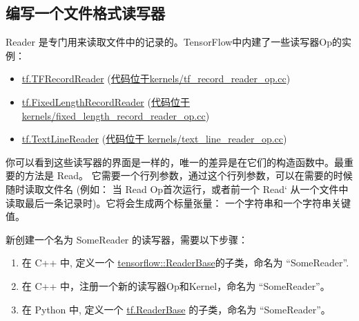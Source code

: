 \subsection{编写一个文件格式读写器
}\label{ux7f16ux5199ux4e00ux4e2aux6587ux4ef6ux683cux5f0fux8bfbux5199ux5668}

Reader
是专门用来读取文件中的记录的。TensorFlow中内建了一些读写器Op的实例：

\begin{itemize}
\tightlist
\item
  \href{tensorflow-zh/SOURCE/api_docs/python/io_ops.md\#TFRecordReader}{tf.TFRecordReader}
  (\href{https://tensorflow.googlesource.com/tensorflow/+/master/tensorflow/core/kernels/tf_record_reader_op.cc}{代码位于kernels/tf\_record\_reader\_op.cc})
\item
  \href{tensorflow-zh/SOURCE/api_docs/python/io_ops.md\#FixedLengthRecordReader}{tf.FixedLengthRecordReader}
  (\href{https://tensorflow.googlesource.com/tensorflow/+/master/tensorflow/core/kernels/fixed_length_record_reader_op.cc}{代码位于
  kernels/fixed\_length\_record\_reader\_op.cc})
\item
  \href{tensorflow-zh/SOURCE/api_docs/python/io_ops.md\#TextLineReader}{tf.TextLineReader}
  (\href{https://tensorflow.googlesource.com/tensorflow/+/master/tensorflow/core/kernels/text_line_reader_op.cc}{代码位于
  kernels/text\_line\_reader\_op.cc})
\end{itemize}

你可以看到这些读写器的界面是一样的，唯一的差异是在它们的构造函数中。最重要的方法是
Read。
它需要一个行列参数，通过这个行列参数，可以在需要的时候随时读取文件名
(例如： 当 Read Op首次运行，或者前一个 Read`
从一个文件中读取最后一条记录时)。它将会生成两个标量张量：
一个字符串和一个字符串关键值。

新创建一个名为 SomeReader 的读写器，需要以下步骤：

\begin{enumerate}
\def\labelenumi{\arabic{enumi}.}
\tightlist
\item
  在 C++ 中, 定义一个
  \href{https://tensorflow.googlesource.com/tensorflow/+/master/tensorflow/core/kernels/reader_base.h}{tensorflow::ReaderBase}的子类，命名为
  ``SomeReader''.
\item
  在 C++ 中，注册一个新的读写器Op和Kernel，命名为 ``SomeReader''。
\item
  在 Python 中, 定义一个
  \href{https://tensorflow.googlesource.com/tensorflow/+/master/tensorflow/python/ops/io_ops.py}{tf.ReaderBase}
  的子类，命名为 ``SomeReader''。
\end{enumerate}

